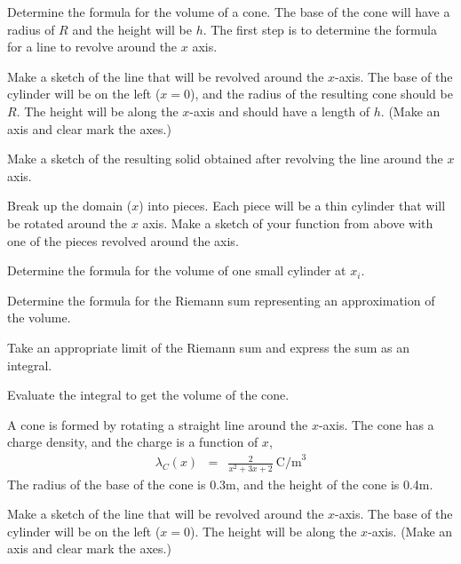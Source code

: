 \begin{problem}
\item Determine the formula for the volume of a cone.
    The base of the cone will have a radius of $R$ and the height will be $h$.
    The first step is to determine the formula for a line to revolve around the $x$ axis.
  \begin{subproblem}
    \item
      Make a sketch of the line that will be revolved around the $x$-axis.
      The base of the cylinder will be on the left ($x=0$), and the radius of the resulting cone should be $R$.
      The height will be along the $x$-axis and should have a length of $h$.
      (Make an axis and clear mark the axes.)
      \vfill

    \item Make a sketch of the resulting solid obtained after
      revolving the line around the $x$ axis.
      \vfill

    \item Break up the domain ($x$) into pieces. Each piece will be a thin cylinder that will be rotated around the $x$ axis.
         Make a sketch of your function from above with one of the pieces revolved around the axis.
      \vfill

    \clearpage

    \item Determine the formula for the volume of one small cylinder at $x_i$.
      \vfill

    \item Determine the formula for the Riemann sum representing an approximation of the volume.
      \vfill

    \item Take an appropriate limit of the Riemann sum and express the sum as an integral.
      \vfill

    \item Evaluate the integral to get the volume of the cone.
      \vfill

  \end{subproblem}

  \clearpage

  \item A cone is formed by rotating a straight line around the $x$-axis.
     The cone has a charge density, and the charge is a function of $x$,
     \begin{eqnarray*}
       \lambda_C(x) & = & \frac{2}{x^2+3x+2} ~ \mathrm{C/m}^3
     \end{eqnarray*}
     The radius of the base of the cone is 0.3m, and the height of the cone is 0.4m.
     \begin{subproblem}
       \item
         Make a sketch of the line that will be revolved around the $x$-axis.
         The base of the cylinder will be on the left ($x=0$).
         The height will be along the $x$-axis.
         (Make an axis and clear mark the axes.)
         \vfill


\end{subproblem}
\end{problem}
